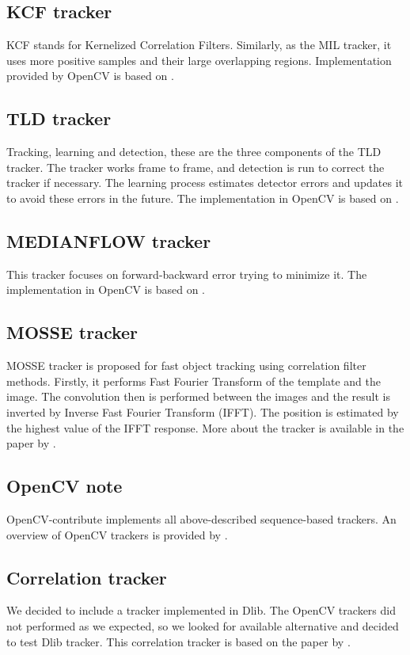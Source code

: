 \subsection*{KCF tracker}
KCF stands for Kernelized Correlation Filters. Similarly, as the MIL tracker,
it uses more positive samples and their large overlapping regions.
Implementation provided by OpenCV is based on \citet*{kcf}.

\subsection*{TLD tracker}
Tracking, learning and detection, these are the three components of the TLD
tracker. The tracker works frame to frame, and detection is run to correct the
tracker if necessary. The learning process estimates detector errors and updates it
to avoid these errors in the future. The implementation in OpenCV is based on
\citet*{tld}.

\subsection*{MEDIANFLOW tracker}
This tracker focuses on forward-backward error trying to minimize it. The
implementation in OpenCV is based on \citet*{medianflow}.

\subsection*{MOSSE tracker}
MOSSE tracker is proposed for fast object tracking using correlation filter
methods. Firstly, it performs Fast Fourier Transform of the template and the image.
The convolution then is performed between the images and the result is
inverted by Inverse Fast Fourier Transform (IFFT). The position is estimated by
the highest value of the IFFT response. More about the tracker is available in
the paper by \citet*{mosse}.

\subsection*{OpenCV note}
OpenCV-contribute implements all above-described sequence-based trackers. An
overview of OpenCV trackers is provided by \citet*{opencv-trackers}.

\subsection*{Correlation tracker}
We decided to include a tracker implemented in Dlib. The OpenCV trackers did
not performed as we expected, so we looked for available alternative and
decided to test Dlib tracker. This correlation tracker is based on the paper by
\citet*{correlation}.

